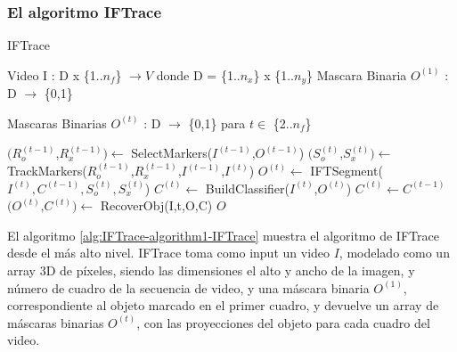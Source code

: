 \documentclass[a4paper,10pt]{article}
\begin{document}
\subsubsection{El algoritmo IFTrace}
\begin{algorithm}
    \caption{IFTrace}
    \label{alg:IFTrace-algorithm1-IFTrace}
    \begin{algorithmic}
        \Require\hspace{\algorithmicindent}\hspace{\algorithmicindent}Video I : D x \{1..$n_{f}$\} $\to V$
        \State\hspace{\algorithmicindent}\hspace{\algorithmicindent}\hspace{\algorithmicindent}\hspace{0.3cm}donde D = \{1..$n_{x}$\} x \{1..$n_{y}$\}
        \State\hspace{\algorithmicindent}\hspace{\algorithmicindent}\hspace{\algorithmicindent}\hspace{0.3cm}Mascara Binaria $O^{(1)}$ : D $\to$ \{0,1\}

        \Ensure \hspace{\algorithmicindent}\hspace{0.23cm} Mascaras Binarias $O^{(t)}$ : D $\to$ \{0,1\} para $t \in $ \{2..$n_f$\}
        \State

            \State $(R^{(t-1)}_{o}$,$R^{(t-1)}_{x}) \gets $  SelectMarkers($I^{(t-1)}$,$O^{(t-1)}$)
            \State $(S^{(t)}_{o}$,$S^{(t)}_{x}) \gets$  TrackMarkers($R^{(t-1)}_{o}$,$R^{(t-1)}_{x}$,$I^{(t-1)}$,$I^{(t)}$)
                \State $O^{(t)} \gets$  IFTSegment($I^{(t)}, C^{(t-1)}, S^{(t)}_{o}, S^{(t)}_{x}$)
                \State$C^{(t)} \gets$ BuildClassifier($I^{(t)}$,$O^{(t)}$)
            \Else
                \State $C^{(t)} \gets C^{(t-1)}$
                \State $(O^{(t)}$,$C^{(t)}) \gets$  RecoverObj(I,t,O,C)
            \EndIf\EndFor
        \State \Return $O$
    \end{algorithmic}
\end{algorithm}

El algoritmo \ref{alg:IFTrace-algorithm1-IFTrace} muestra el algoritmo de IFTrace
desde el más alto nivel. IFTrace toma como input un video $I$, modelado como un
array 3D de píxeles, siendo las dimensiones el alto y ancho de la imagen, y
número de cuadro de la secuencia de video, y una máscara binaria $O^{(1)}$,
correspondiente al objeto marcado en el primer cuadro, y devuelve un array de
máscaras binarias $O^{(t)}$, con las proyecciones del objeto para cada cuadro
del video.
\end{document}
